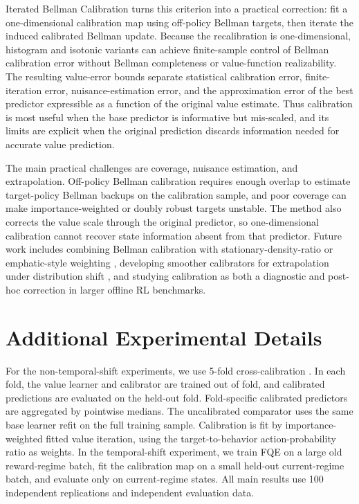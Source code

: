 \documentclass{article}
\theoremstyle{plain}
\theoremstyle{definition}
\theoremstyle{remark}
\begin{document}
Iterated Bellman Calibration turns this criterion into a practical correction:
fit a one-dimensional calibration map using off-policy Bellman targets, then
iterate the induced calibrated Bellman update. Because the recalibration is
one-dimensional, histogram and isotonic variants can achieve finite-sample
control of Bellman calibration error without Bellman completeness or
value-function realizability. The resulting value-error bounds separate
statistical calibration error, finite-iteration error, nuisance-estimation
error, and the approximation error of the best predictor expressible as a
function of the original value estimate. Thus calibration is most useful when
the base predictor is informative but mis-scaled, and its limits are explicit
when the original prediction discards information needed for accurate value
prediction.

The main practical challenges are coverage, nuisance estimation, and
extrapolation. Off-policy Bellman calibration requires enough overlap to estimate
target-policy Bellman backups on the calibration sample, and poor coverage can
make importance-weighted or doubly robust targets unstable. The method also
corrects the value scale through the original predictor, so one-dimensional
calibration cannot recover state information absent from that predictor. Future
work includes combining Bellman calibration with stationary-density-ratio or
emphatic-style weighting \citep{vdLaanKallus2025FQE,mahmood2015emphatic,patterson2022generalized}, developing smoother calibrators for extrapolation
under distribution shift \citep{platt1999probabilistic,jiang2011smooth,guo2017calibration}, and studying calibration as both a diagnostic and
post-hoc correction in larger offline RL benchmarks.
 



\section{Additional Experimental Details}
\label{app:experiments}

For the non-temporal-shift experiments, we use 5-fold cross-calibration
\citep{van2023causal}. In each fold, the value learner and calibrator are
trained out of fold, and calibrated predictions are evaluated on the held-out
fold. Fold-specific calibrated predictors are aggregated by pointwise medians.
The uncalibrated comparator uses the same base learner refit on the full
training sample. Calibration is fit by importance-weighted fitted value
iteration, using the target-to-behavior action-probability ratio as weights. In
the temporal-shift experiment, we train FQE on a large old reward-regime batch,
fit the calibration map on a small held-out current-regime batch, and evaluate
only on current-regime states. All main results use 100 independent replications
and independent evaluation data.
\end{document}
